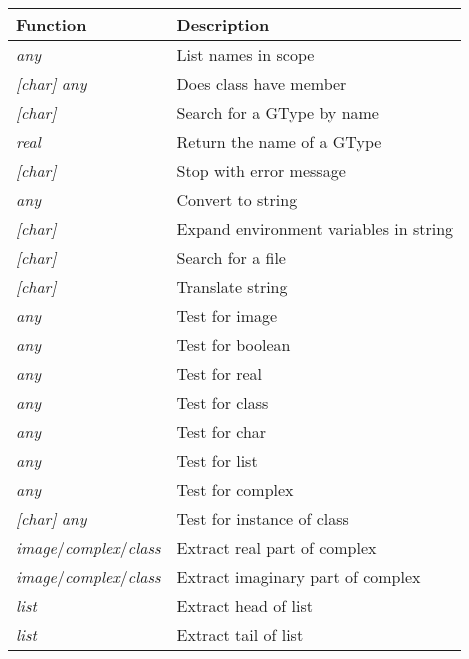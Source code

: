 \begin{tab2}
\begin{center}
\begin{tabular}{||l|l||}
\hline
Function & Description \\
\hline
\ct{dir} \textit{any}		& List names in scope \\
\ct{has\_member} \textit{[char]} \textit{any}	& 
				Does class have member \\
\hline
\ct{name2gtype} \textit{[char]}	& Search for a GType by name \\
\ct{gtype2name} \textit{real}	& Return the name of a GType \\
\hline
\ct{error} \textit{[char]}	& Stop with error message \\
\ct{print} \textit{any}		& Convert to string \\
\ct{expand} \textit{[char]}	& Expand environment variables in string \\
\ct{search} \textit{[char]}	& Search for a file \\
\ct{\_} \textit{[char]}		& Translate string \\
\hline
\ct{is\_image} \textit{any}	& Test for image \\
\ct{is\_bool} \textit{any}	& Test for boolean \\
\ct{is\_real} \textit{any}	& Test for real	\\
\ct{is\_class} \textit{any}	& Test for class \\
\ct{is\_char} \textit{any}	& Test for char	\\
\ct{is\_list} \textit{any}	& Test for list	\\
\ct{is\_complex} \textit{any}	& Test for complex \\
\ct{is\_instanceof} \textit{[char]} \textit{any}	& 
				Test for instance of class	\\
\hline
\ct{re} \textit{image}/\textit{complex}/\textit{class} & 
				Extract real part of complex	\\
\ct{im}	\textit{image}/\textit{complex}/\textit{class} &
				Extract imaginary part of complex \\
\ct{hd} \textit{list}		& Extract head of list \\
\ct{tl}	\textit{list}		& Extract tail of list \\


\end{tabular}
\end{center}
\end{tab2}
